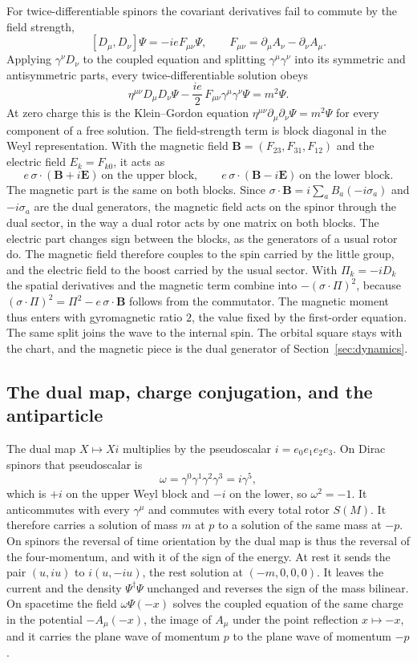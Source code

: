 \documentclass[a4paper]{article}
\begin{document}
For twice-differentiable spinors the covariant derivatives fail to commute by the field strength,
\[
[D_\mu,D_\nu]\Psi=-ieF_{\mu\nu}\Psi,\qquad F_{\mu\nu}=\partial_\mu A_\nu-\partial_\nu A_\mu .
\]
Applying $\gamma^\nu D_\nu$ to the coupled equation and splitting $\gamma^\mu\gamma^\nu$ into its symmetric and antisymmetric parts, every twice-differentiable solution obeys
\[
\eta^{\mu\nu}D_\mu D_\nu\Psi-\frac{ie}{2}\,F_{\mu\nu}\gamma^\mu\gamma^\nu\Psi=m^2\Psi .
\]
At zero charge this is the Klein--Gordon equation $\eta^{\mu\nu}\partial_\mu\partial_\nu\Psi=m^2\Psi$ for every component of a free solution. The field-strength term is block diagonal in the Weyl representation. With the magnetic field $\mathbf B=(F_{23},F_{31},F_{12})$ and the electric field $E_k=F_{k0}$, it acts as
\[
e\,\sigma\cdot(\mathbf B+i\mathbf E)\ \text{on the upper block},\qquad
e\,\sigma\cdot(\mathbf B-i\mathbf E)\ \text{on the lower block}.
\]
The magnetic part is the same on both blocks. Since $\sigma\cdot\mathbf B=i\sum_a B_a(-i\sigma_a)$ and $-i\sigma_a$ are the dual generators, the magnetic field acts on the spinor through the dual sector, in the way a dual rotor acts by one matrix on both blocks. The electric part changes sign between the blocks, as the generators of a usual rotor do. The magnetic field therefore couples to the spin carried by the little group, and the electric field to the boost carried by the usual sector. With $\Pi_k=-iD_k$ the spatial derivatives and the magnetic term combine into $-(\sigma\cdot\Pi)^2$, because $(\sigma\cdot\Pi)^2=\Pi^2-e\,\sigma\cdot\mathbf B$ follows from the commutator. The magnetic moment thus enters with gyromagnetic ratio $2$, the value fixed by the first-order equation. The same split joins the wave to the internal spin. The orbital square stays with the chart, and the magnetic piece is the dual generator of Section~\ref{sec:dynamics}.

\subsection{The dual map, charge conjugation, and the antiparticle}
\label{subsec:antiparticle}

The dual map $X\mapsto Xi$ multiplies by the pseudoscalar $i=e_0e_1e_2e_3$. On Dirac spinors that pseudoscalar is
\[
\omega=\gamma^0\gamma^1\gamma^2\gamma^3=i\gamma^5,
\]
which is $+i$ on the upper Weyl block and $-i$ on the lower, so $\omega^2=-1$. It anticommutes with every $\gamma^\mu$ and commutes with every total rotor $S(M)$. It therefore carries a solution of mass $m$ at $p$ to a solution of the same mass at $-p$. On spinors the reversal of time orientation by the dual map is thus the reversal of the four-momentum, and with it of the sign of the energy. At rest it sends the pair $(u,iu)$ to $i(u,-iu)$, the rest solution at $(-m,0,0,0)$. It leaves the current and the density $\Psi^\dagger\Psi$ unchanged and reverses the sign of the mass bilinear. On spacetime the field $\omega\Psi(-x)$ solves the coupled equation of the same charge in the potential $-A_\mu(-x)$, the image of $A_\mu$ under the point reflection $x\mapsto -x$, and it carries the plane wave of momentum $p$ to the plane wave of momentum $-p$.
\end{document}
